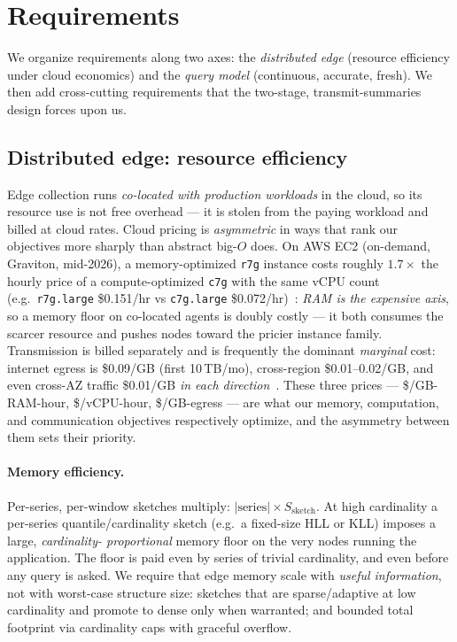 \section{Requirements}
\label{sec:requirements}

We organize requirements along two axes: the \emph{distributed edge}
(resource efficiency under cloud economics) and the \emph{query model}
(continuous, accurate, fresh). We then add cross-cutting requirements
that the two-stage, transmit-summaries design forces upon us.

\subsection{Distributed edge: resource efficiency}

Edge collection runs \emph{co-located with production workloads} in the
cloud, so its resource use is not free overhead --- it is stolen from the
paying workload and billed at cloud rates. Cloud pricing is
\emph{asymmetric} in ways that rank our objectives more sharply than
abstract big-$O$ does. On AWS EC2 (on-demand, Graviton, mid-2026), a
memory-optimized \texttt{r7g} instance costs roughly $1.7\times$ the
hourly price of a compute-optimized \texttt{c7g} with the same vCPU count
(e.g.\ \texttt{r7g.large} \$0.151/hr vs \texttt{c7g.large}
\$0.072/hr)~\cite{awsec2pricing}: \emph{RAM is the expensive
axis}, so a memory floor on co-located agents is doubly costly --- it both
consumes the scarcer resource and pushes nodes toward the pricier
instance family. Transmission is billed separately and is frequently the
dominant \emph{marginal} cost: internet egress is \$0.09/GB (first
10\,TB/mo), cross-region \$0.01--0.02/GB, and even cross-AZ traffic
\$0.01/GB \emph{in each direction}~\cite{awsdatatransfer}. These three
prices --- \$/GB-RAM-hour, \$/vCPU-hour, \$/GB-egress --- are what our
memory, computation, and communication objectives respectively optimize,
and the asymmetry between them sets their priority.

\paragraph{Memory efficiency.}
Per-series, per-window sketches multiply: $|\text{series}| \times
S_\text{sketch}$. At high cardinality a per-series quantile/cardinality
sketch (e.g.\ a fixed-size HLL or KLL) imposes a large, \emph{cardinality-
proportional} memory floor on the very nodes running the application. The
floor is paid even by series of trivial cardinality, and even before any
query is asked. We require that edge memory scale with \emph{useful
information}, not with worst-case structure size: sketches that are
sparse/adaptive at low cardinality and promote to dense only when
warranted; and bounded total footprint via cardinality caps with graceful
overflow.

